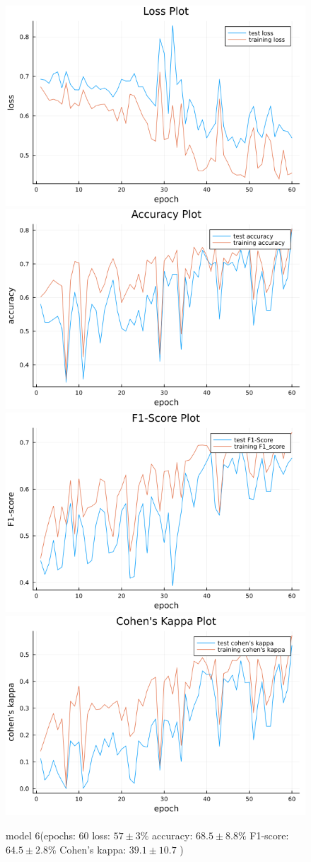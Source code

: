 \documentclass[
a4paper, 
12pt,
grayscalebody, %
abstract=on,
twoside, BCOR10mm, 12pt, DIV13,headinclude, footexclude, final, abstracton, openright
]{ibireprt}
\numberwithin{equation}{chapter}
\numberwithin{table}{chapter}
\numberwithin{figure}{chapter}
\numberwithin{algorithm}{chapter}
\numberwithin{example}{chapter}
\numberwithin{example}{chapter}
\begin{document}
\begin{figure}
	\includegraphics[width=0.4\linewidth]{loss_png_final_2_2.png}\hfill
	\includegraphics[width=0.4\linewidth]{accuracy_png_final_2_2.png}
	\\[\smallskipamount]
	\includegraphics[width=0.4\linewidth]{f1_score_png_final_2_2.png}\hfill
	\includegraphics[width=0.4\linewidth]{cohens_kappa_png_final_2_2.png}
	\caption{model 6(epochs: 60 loss: $57\pm3\% $ accuracy: $68.5\pm8.8\%$ F1-score: $64.5\pm2.8\%$  Cohen's kappa: $39.1\pm10.7$ )}
\end{figure}
\end{document}
